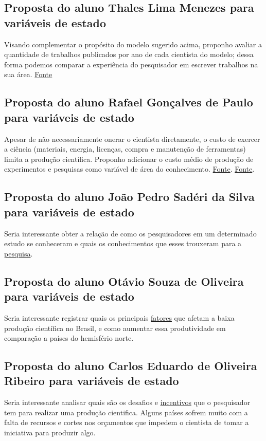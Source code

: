 \subsection{Proposta do aluno Thales Lima Menezes para variáveis de estado}
Visando complementar o propósito do modelo sugerido acima, proponho avaliar a quantidade de trabalhos publicados por ano de cada cientista do modelo; dessa forma podemos comparar a experiência do pesquisador em escrever trabalhos na sua área. \href{https://www.upf.br/biblioteca/noticia/brasil-lidera-ranking-de-paises-com-maior-quantidade-de-publicacoes-cientificas-em-acesso-aberto}{Fonte}

\subsection{Proposta do aluno Rafael Gonçalves de Paulo para variáveis de estado}
Apesar de não necessariamente onerar o cientista diretamente, o custo de exercer a ciência (materiais, energia, licenças, compra e manutenção de ferramentas) limita a produção científica. Proponho adicionar o custo médio de produção de experimentos e pesquisas como variável de área do conhecimento. \href{https://www.nature.com/articles/495426a}{Fonte}. \href{https://intpolicydigest.org/the-cost-of-science/}{Fonte}.

\subsection{Proposta do aluno João  Pedro Sadéri da  Silva para variáveis de estado}
Seria interessante obter a relação de como os pesquisadores em um determinado estudo se conheceram e quais os conhecimentos que esses trouxeram para a \href{https://pt.wikipedia.org/wiki/Pesquisa}{pesquisa}.


\subsection{Proposta do aluno Otávio Souza de Oliveira para variáveis de estado}

Seria interessante registrar quais os principais \href{https://blog.even3.com.br/pesquisas-cientificas-no-brasil/}{fatores} que afetam a baixa produção científica no Brasil, e como aumentar essa produtividade em comparação a países do hemisfério norte.

\subsection{Proposta do aluno Carlos Eduardo de Oliveira Ribeiro para variáveis de estado}
Seria interessante analisar quais são os desafios e \href{https://www.nber.org/system/files/working_papers/w26752/w26752.pdf}{incentivos} que o pesquisador tem para realizar uma produção cientifica. Alguns países sofrem muito com a falta de recursos e cortes nos orçamentos que impedem o cientista de tomar a iniciativa para produzir algo.

